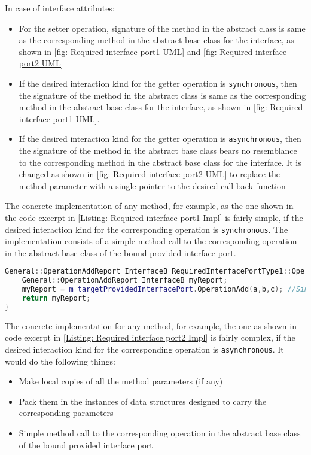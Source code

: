 In case of interface attributes:
\begin{itemize}
\item For the setter operation, signature of the method in the abstract class is same as the corresponding method in the abstract base class for the interface, as shown in \cref{fig: Required interface port1 UML} and \cref{fig: Required interface port2 UML}
\item If the desired interaction kind for the getter operation is \texttt{synchronous}, then the signature of the method in the abstract class is same as the corresponding method in the abstract base class for the interface, as shown in \cref{fig: Required interface port1 UML}. 
\item If the desired interaction kind for the getter operation is \texttt{asynchronous}, then the signature of the method in the abstract base class bears no resemblance to the corresponding method in the abstract base class for the interface. It is changed as shown in \cref{fig: Required interface port2 UML} to replace the method parameter with a single pointer to the desired call-back function  
\end{itemize} 

The concrete implementation of any method, for example, as the one shown in the code excerpt in \cref{Listing: Required interface port1 Impl} is fairly simple, if the desired interaction kind for the corresponding operation is \texttt{synchronous}. The implementation consists of a simple method call to the corresponding operation in the abstract base class of the bound provided interface port.

\begin{Listing}
\begin{lstlisting}[language=C++]
General::OperationAddReport_InterfaceB RequiredInterfacePortType1::OperationAdd (const IntegerType& a,const IntegerType& b,IntegerType& c) {
	General::OperationAddReport_InterfaceB myReport;
	myReport = m_targetProvidedInterfacePort.OperationAdd(a,b,c); //Simple method call
	return myReport;
}
\end{lstlisting}
\caption{Code excerpt from the generated code for requesting service \texttt{OperationAdd} in \texttt{Required\allowbreak InterfacePort\allowbreak Type1}}
\label{Listing: Required interface port1 Impl}
\end{Listing}

The concrete implementation for any method, for example, the one as shown in code excerpt in \cref{Listing: Required interface port2 Impl} is fairly complex, if the desired interaction kind for the corresponding operation is \texttt{asynchronous}. It would do the following things: 
\begin{itemize}
\item Make local copies of all the method parameters (if any)
\item Pack them in the instances of data structures designed to carry the corresponding parameters
\item Simple method call to the corresponding operation in the abstract base class of the bound provided interface port
\end{itemize}

